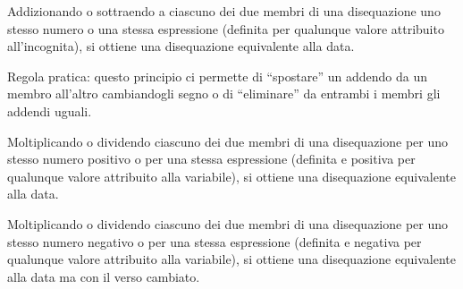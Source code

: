 \begin{principio}[I Principio]
\label{ppd}
Addizionando o sottraendo a ciascuno dei due membri di
una disequazione uno stesso numero o una
stessa espressione (definita per qualunque
valore attribuito all'incognita), si ottiene una
disequazione equivalente alla data.
\end{principio}

Regola pratica: questo principio ci permette di
``spostare'' un addendo da un membro
all'altro cambiandogli segno o di
``eliminare'' da entrambi i membri
gli addendi uguali.

\begin{principio}[II Principio]
Moltiplicando o dividendo ciascuno dei due membri di
una disequazione per uno stesso numero positivo o per
una stessa espressione (definita e positiva
per qualunque valore attribuito alla variabile), si ottiene una
disequazione equivalente alla data.
\end{principio}


\begin{principio}
Moltiplicando o dividendo ciascuno dei due membri di
una disequazione per uno stesso numero negativo o per
una stessa espressione (definita e negativa
per qualunque valore attribuito alla variabile), si ottiene una
disequazione equivalente alla data ma con il verso cambiato.
\end{principio}

